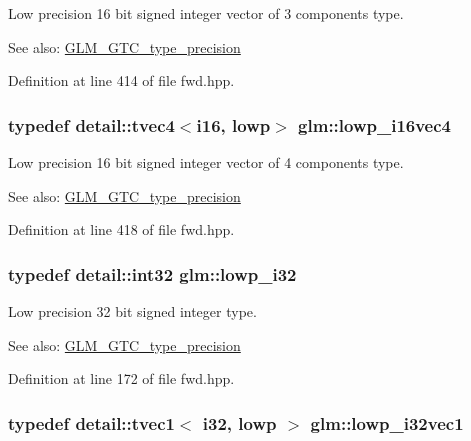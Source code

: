 Low precision 16 bit signed integer vector of 3 components type. \begin{Desc}
\item[See also:]\hyperlink{group__gtc__type__precision}{GLM\_\-GTC\_\-type\_\-precision} \end{Desc}


Definition at line 414 of file fwd.hpp.\hypertarget{group__gtc__type__precision_g59ea63973187e1e990fb6633d1800c6d}{
\subsubsection[lowp\_\-i16vec4]{\setlength{\rightskip}{0pt plus 5cm}typedef detail::tvec4$<$i16, lowp$>$ {\bf glm::lowp\_\-i16vec4}}}
\label{group__gtc__type__precision_g59ea63973187e1e990fb6633d1800c6d}


Low precision 16 bit signed integer vector of 4 components type. \begin{Desc}
\item[See also:]\hyperlink{group__gtc__type__precision}{GLM\_\-GTC\_\-type\_\-precision} \end{Desc}


Definition at line 418 of file fwd.hpp.\hypertarget{group__gtc__type__precision_g70fd34e8b8cffc92739161284ed77328}{
\subsubsection[lowp\_\-i32]{\setlength{\rightskip}{0pt plus 5cm}typedef detail::int32 {\bf glm::lowp\_\-i32}}}
\label{group__gtc__type__precision_g70fd34e8b8cffc92739161284ed77328}


Low precision 32 bit signed integer type. \begin{Desc}
\item[See also:]\hyperlink{group__gtc__type__precision}{GLM\_\-GTC\_\-type\_\-precision} \end{Desc}


Definition at line 172 of file fwd.hpp.\hypertarget{group__gtc__type__precision_gdb82f1c8a0f4d3304862d32079961974}{
\subsubsection[lowp\_\-i32vec1]{\setlength{\rightskip}{0pt plus 5cm}typedef detail::tvec1$<$ i32, lowp $>$ {\bf glm::lowp\_\-i32vec1}}}
\label{group__gtc__type__precision_gdb82f1c8a0f4d3304862d32079961974}


